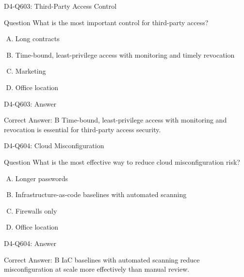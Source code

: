 \documentclass{beamer}
\begin{document}
	\begin{frame}{D4-Q603: Third-Party Access Control}
		\begin{block}{Question}
			What is the most important control for third-party access?
		\end{block}
		\begin{enumerate}[(A)]
			\item Long contracts
			\item Time-bound, least-privilege access with monitoring and timely revocation
			\item Marketing
			\item Office location
		\end{enumerate}
	\end{frame}
	\begin{frame}{D4-Q603: Answer}
		\begin{block}{Correct Answer: B}
			Time-bound, least-privilege access with monitoring and revocation is essential for third-party access security.
		\end{block}
	\end{frame}
	
	\begin{frame}{D4-Q604: Cloud Misconfiguration}
		\begin{block}{Question}
			What is the most effective way to reduce cloud misconfiguration risk?
		\end{block}
		\begin{enumerate}[(A)]
			\item Longer passwords
			\item Infrastructure-as-code baselines with automated scanning
			\item Firewalls only
			\item Office location
		\end{enumerate}
	\end{frame}
	\begin{frame}{D4-Q604: Answer}
		\begin{block}{Correct Answer: B}
			IaC baselines with automated scanning reduce misconfiguration at scale more effectively than manual review.
		\end{block}
	\end{frame}
	
\end{document}
